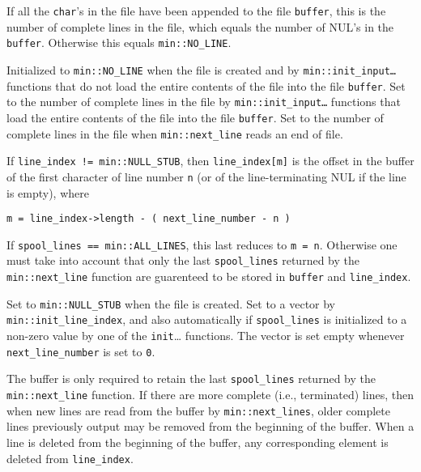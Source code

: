 \documentclass[12pt]{article}
\makeatletter
\newcommand{\ttmkey}[2]{{\tt \bf #1}\index{#1@{\tt #1}!#2}}
\newcommand{\EOL}{\penalty \exhyphenpenalty}
\newenvironment{itemlist}[1][1.2in]%
	{\begin{list}{}{\setlength{\labelwidth}{#1}%
		        \setlength{\leftmargin}{\labelwidth}%
		        \addtolength{\leftmargin}{+0.2in}%
		        \renewcommand{\makelabel}[1]{##1\hfill}}}%
	{\end{list}}
\makeatother
\begin{document}
\begin{itemlist}[1.4in]
\item[\ttmkey{file\_\EOL lines}{in {\tt min::file}}]
If all the {\tt char}'s in the file have been appended to the file {\tt buffer},
this is the number of complete lines in the file, which equals
the number of NUL's in the {\tt buffer}.  Otherwise this equals
{\tt min::\EOL NO\_\EOL LINE}.

Initialized to {\tt min::\EOL NO\_\EOL LINE} when the file is created and by
{\tt min::\EOL init\_\EOL input\ldots} functions that do not load
the entire contents of the file into the file {\tt buffer}.
Set to the number of complete lines in the file
by {\tt min::\EOL init\_\EOL input\ldots} functions that load
the entire contents of the file into the file {\tt buffer}.
Set to the number of complete lines in the file
when {\tt min::\EOL next\_\EOL line} reads an end of file.

\item[\ttmkey{line\_\EOL index}{in {\tt min::file}}]
If {\tt line\_index~!=~min::NULL\_STUB}, then
{\tt line\_index[m]} is the offset in the buffer of the first
character of line number {\tt n} (or of the line-terminating NUL
if the line is empty), where
\begin{center}
{\tt m = line\_index->length - ( next\_line\_number - n )}
\end{center}
If {\tt spool\_lines~==~min::ALL\_LINES}, this last reduces to {\tt m~=~n}.
Otherwise one must take into account that only the last
{\tt spool\_\EOL lines} returned by the {\tt min::\EOL next\_\EOL line}
function are guarenteed to be
stored in {\tt buffer} and {\tt line\_\EOL index}.

Set to {\tt min::NULL\_STUB} when the file is created.
Set to a vector by {\tt min::\EOL init\_\EOL line\_\EOL index}, and
also automatically if {\tt spool\_\EOL lines} is initialized
to a non-zero value by one of the {\tt init}\ldots{} functions.
The vector is set empty whenever {\tt next\_\EOL line\_\EOL number}
is set to {\tt 0}.

\item[\ttmkey{spool\_\EOL lines}{in {\tt min::file}}]
The buffer is only required to retain the last {\tt spool\_\EOL lines}
returned by the {\tt min::\EOL next\_\EOL line} function.
If there are more complete (i.e., terminated)
lines, then when new lines are read from the buffer
by {\tt min::\EOL next\_\EOL lines},
older complete lines previously
output may be removed from the beginning of the buffer.
When a line is deleted from the beginning of the buffer, any
corresponding element is deleted from {\tt line\_\EOL index}.


\end{itemlist}
\end{document}
